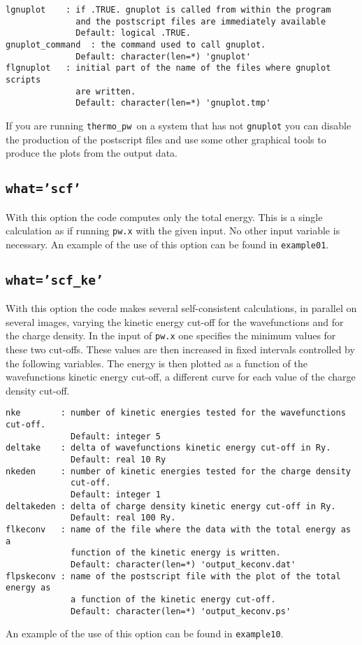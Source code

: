 \documentclass[12pt,a4paper]{article}
\def\thermo{\texttt{thermo\_pw}}
\begin{document}
\begin{verbatim}
lgnuplot    : if .TRUE. gnuplot is called from within the program
              and the postscript files are immediately available
              Default: logical .TRUE.
gnuplot_command  : the command used to call gnuplot.
              Default: character(len=*) 'gnuplot'
flgnuplot   : initial part of the name of the files where gnuplot scripts 
              are written.
              Default: character(len=*) 'gnuplot.tmp'
\end{verbatim}
If you are running \thermo\ on a system that has not \texttt{gnuplot}
you can disable the production of the postscript files and use some other
graphical tools to produce the plots from the output data. 


\subsection{\texttt{what='scf'}}
With this option the code computes only the total energy. This is a single
calculation as if running \texttt{pw.x} with the given input.
No other input variable is necessary.
An example of the use of this option can be found in \texttt{example01}.

\subsection{\texttt{what='scf\_ke'}}
With this option the code makes several self-consistent calculations, 
in parallel on several images, varying the kinetic energy cut-off for 
the wavefunctions and for the charge density. 
In the input of \texttt{pw.x} one specifies the minimum values for these two 
cut-offs. These values are then increased in fixed intervals controlled by the 
following variables. The energy is then plotted as a function of the 
wavefunctions kinetic energy cut-off, a different curve for each value of 
the charge density cut-off.

\begin{verbatim}
nke        : number of kinetic energies tested for the wavefunctions cut-off.
             Default: integer 5
deltake    : delta of wavefunctions kinetic energy cut-off in Ry.
             Default: real 10 Ry
nkeden     : number of kinetic energies tested for the charge density
             cut-off.
             Default: integer 1
deltakeden : delta of charge density kinetic energy cut-off in Ry.
             Default: real 100 Ry.
flkeconv   : name of the file where the data with the total energy as a
             function of the kinetic energy is written.
             Default: character(len=*) 'output_keconv.dat'
flpskeconv : name of the postscript file with the plot of the total energy as
             a function of the kinetic energy cut-off.
             Default: character(len=*) 'output_keconv.ps'
\end{verbatim}
An example of the use of this option can be found in \texttt{example10}.
\end{document}
